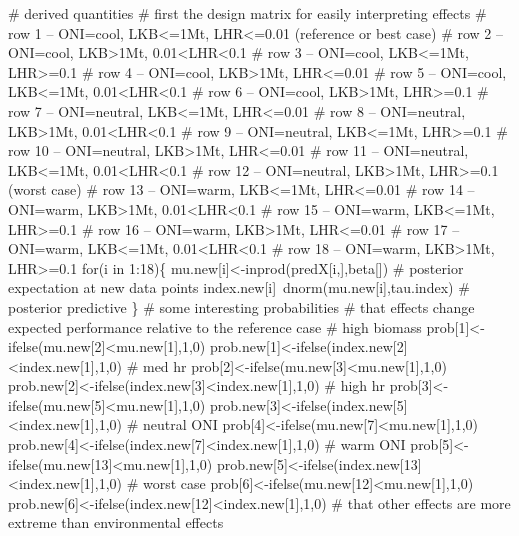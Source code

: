 \documentclass[]{elsarticle} %
\newenvironment{Shaded}{\begin{snugshade}}{\end{snugshade}}
\newcommand{\StringTok}[1]{\textcolor[rgb]{0.31,0.60,0.02}{#1}}
\begin{document}
\begin{Shaded}
\begin{Highlighting}[numbers=left,,]
{{\StringTok{    # derived quantities}
\StringTok{    # first the design matrix for easily interpreting effects}
\StringTok{    # row 1 -- ONI=cool, LKB<=1Mt, LHR<=0.01 (reference or best case)}
\StringTok{    # row 2 -- ONI=cool, LKB>1Mt, 0.01<LHR<0.1}
\StringTok{    # row 3 -- ONI=cool, LKB<=1Mt, LHR>=0.1}
\StringTok{    # row 4 -- ONI=cool, LKB>1Mt, LHR<=0.01}
\StringTok{    # row 5 -- ONI=cool, LKB<=1Mt, 0.01<LHR<0.1}
\StringTok{    # row 6 -- ONI=cool, LKB>1Mt, LHR>=0.1}
\StringTok{    # row 7 -- ONI=neutral, LKB<=1Mt, LHR<=0.01}
\StringTok{    # row 8 -- ONI=neutral, LKB>1Mt, 0.01<LHR<0.1}
\StringTok{    # row 9 -- ONI=neutral, LKB<=1Mt, LHR>=0.1}
\StringTok{    # row 10 -- ONI=neutral, LKB>1Mt, LHR<=0.01}
\StringTok{    # row 11 -- ONI=neutral, LKB<=1Mt, 0.01<LHR<0.1}
\StringTok{    # row 12 -- ONI=neutral, LKB>1Mt, LHR>=0.1 (worst case)}
\StringTok{    # row 13 -- ONI=warm, LKB<=1Mt, LHR<=0.01}
\StringTok{    # row 14 -- ONI=warm, LKB>1Mt, 0.01<LHR<0.1}
\StringTok{    # row 15 -- ONI=warm, LKB<=1Mt, LHR>=0.1}
\StringTok{    # row 16 -- ONI=warm, LKB>1Mt, LHR<=0.01}
\StringTok{    # row 17 -- ONI=warm, LKB<=1Mt, 0.01<LHR<0.1}
\StringTok{    # row 18 -- ONI=warm, LKB>1Mt, LHR>=0.1}
\StringTok{    for(i in 1:18)\{}
\StringTok{      mu.new[i]<-inprod(predX[i,],beta[]) # posterior expectation at new data points}
\StringTok{      index.new[i]~dnorm(mu.new[i],tau.index) # posterior predictive}
\StringTok{    \}}
\StringTok{    }
\StringTok{    # some interesting probabilities}
\StringTok{    }
\StringTok{    # that effects change expected performance relative to the reference case}
\StringTok{    # high biomass}
\StringTok{    prob[1]<-ifelse(mu.new[2]<mu.new[1],1,0)}
\StringTok{    prob.new[1]<-ifelse(index.new[2]<index.new[1],1,0)}
\StringTok{    # med hr}
\StringTok{    prob[2]<-ifelse(mu.new[3]<mu.new[1],1,0)}
\StringTok{    prob.new[2]<-ifelse(index.new[3]<index.new[1],1,0)}
\StringTok{    # high hr}
\StringTok{    prob[3]<-ifelse(mu.new[5]<mu.new[1],1,0)}
\StringTok{    prob.new[3]<-ifelse(index.new[5]<index.new[1],1,0)}
\StringTok{    # neutral ONI}
\StringTok{    prob[4]<-ifelse(mu.new[7]<mu.new[1],1,0)}
\StringTok{    prob.new[4]<-ifelse(index.new[7]<index.new[1],1,0)}
\StringTok{    # warm ONI}
\StringTok{    prob[5]<-ifelse(mu.new[13]<mu.new[1],1,0)}
\StringTok{    prob.new[5]<-ifelse(index.new[13]<index.new[1],1,0)}
\StringTok{    # worst case}
\StringTok{    prob[6]<-ifelse(mu.new[12]<mu.new[1],1,0)}
\StringTok{    prob.new[6]<-ifelse(index.new[12]<index.new[1],1,0)}
\StringTok{    }
\StringTok{    # that other effects are more extreme than environmental effects}
}}
\end{Highlighting}
\end{Shaded}
\end{document}
